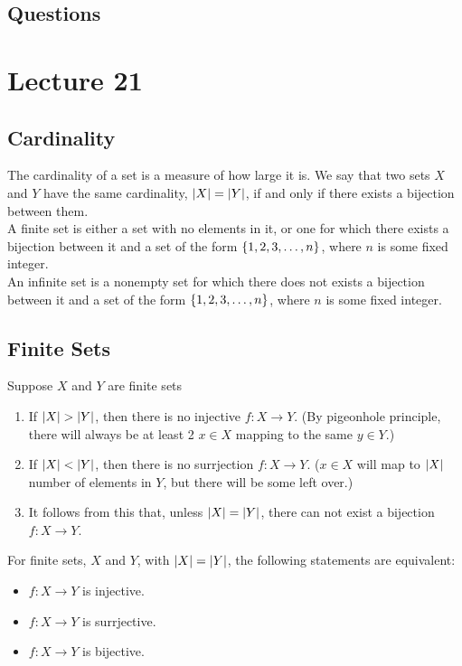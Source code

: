 \documentclass{report}
\begin{document}
\subsection*{Questions}
\qs{}{}

\newpage
\section{Lecture 21}
\subsection*{Cardinality}
The cardinality of a set is a measure of how large it is. We say that two sets $X$ and $Y$ have the same cardinality, $\left| X \right| = \left| Y \right|$, if and only if there exists a bijection between them. \\

A finite set is either a set with no elements in it, or one for which there exists a bijection between it and a set of the form $\left\lbrace 1,2,3,\dots,n \right\rbrace$, where $n$ is some fixed integer. \\

An infinite set is a nonempty set for which there does not exists a bijection between it and a set of the form $\left\lbrace 1,2,3,\dots,n \right\rbrace$, where $n$ is some fixed integer.

\subsection*{Finite Sets}
\Theom Suppose $X$ and $Y$ are finite sets
\begin{enumerate}
	\item If $\left| X \right| > \left| Y \right|$, then there is no injective $f:X\to Y$. (By pigeonhole principle, there will always be at least 2 $x\in X$ mapping to the same $y\in Y$.)
	\item If $\left| X \right| < \left| Y \right|$, then there is no surrjection $f:X\to Y$. ($x\in X$ will map to $\left| X \right|$ number of elements in $Y$, but there will be some left over.)
	\item It follows from this that, unless $\left| X \right|=\left| Y \right|$, there can not exist a bijection $f:X\to Y$.
\end{enumerate}
\Corol For finite sets, $X$ and $Y$, with $\left| X \right|=\left| Y \right|$, the following statements are equivalent:
\begin{itemize}
	\item $f:X\to Y$ is injective.	
	\item $f:X\to Y$ is surrjective.
	\item $f:X\to Y$ is bijective.
\end{itemize}
\end{document}
